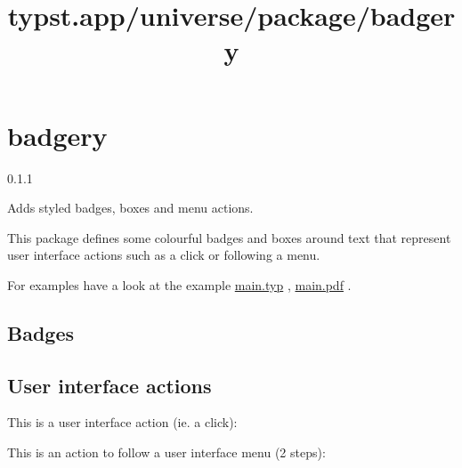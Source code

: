\title{typst.app/universe/package/badgery}

\label{banner}
\section{badgery}\label{badgery}

{ 0.1.1 }

Adds styled badges, boxes and menu actions.

\label{readme}
This package defines some colourful badges and boxes around text that
represent user interface actions such as a click or following a menu.

For examples have a look at the example
\href{https://github.com/typst/packages/raw/main/packages/preview/badgery/0.1.1/example/main.typ}{main.typ}
,
\href{https://github.com/typst/packages/raw/main/packages/preview/badgery/0.1.1/exmaple/main.pdf}{main.pdf}
.


\subsection{Badges}\label{badges}

\begin{Shaded}
\begin{Highlighting}[]
\end{Highlighting}
\end{Shaded}

\subsection{User interface actions}\label{user-interface-actions}

This is a user interface action (ie. a click):

\begin{Shaded}
\begin{Highlighting}[]
\end{Highlighting}
\end{Shaded}

This is an action to follow a user interface menu (2 steps):

